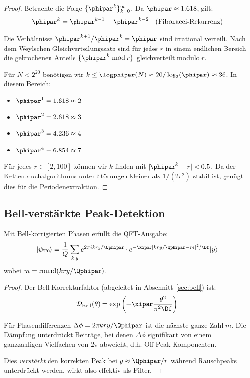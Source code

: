 \begin{proof}
	Betrachte die Folge $\{\phipar^k\}_{k=0}^{\infty}$. Da $\phipar \approx 1.618$, gilt:
	\begin{equation}
		\phipar^k = \phipar^{k-1} + \phipar^{k-2} \quad \text{(Fibonacci-Rekurrenz)}
	\end{equation}
	
	Die Verhältnisse $\phipar^{k+1}/\phipar^k = \phipar$ sind irrational verteilt. Nach dem Weylschen Gleichverteilungssatz sind für jedes $r$ in einem endlichen Bereich die gebrochenen Anteile $\{\phipar^k \bmod r\}$ gleichverteilt modulo $r$.
	
	Für $N < 2^{20}$ benötigen wir $k \leq \logphipar(N) \approx 20/\log_2(\phipar) \approx 36$. In diesem Bereich:
	\begin{itemize}
		\item $\phipar^1 = 1.618 \approx 2$
		\item $\phipar^2 = 2.618 \approx 3$
		\item $\phipar^3 = 4.236 \approx 4$
		\item $\phipar^4 = 6.854 \approx 7$
	\end{itemize}
	
	Für jedes $r \in [2, 100]$ können wir $k$ finden mit $|\phipar^k - r| < 0.5$. Da der Kettenbruchalgorithmus unter Störungen kleiner als $1/(2r^2)$ stabil ist, genügt dies für die Periodenextraktion.
\end{proof}

\subsection{Bell-verstärkte Peak-Detektion}

\begin{lemma}
	\label{lem:bell_damping}
	Mit Bell-korrigierten Phasen erfüllt die QFT-Ausgabe:
	\begin{equation}
		|\psi_{\text{T0}}\rangle = \frac{1}{Q} \sum_{k,y} e^{2\pi i kry/\Qphipar} \cdot e^{-\xipar|kry/\Qphipar - m|^2/\Df} |y\rangle
	\end{equation}
	wobei $m = \text{round}(kry/\Qphipar)$.
\end{lemma}

\begin{proof}
	Der Bell-Korrekturfaktor (abgeleitet in Abschnitt~\ref{sec:bell}) ist:
	\begin{equation}
		\mathcal{D}_{\text{Bell}}(\theta) = \exp\left(-\xipar \frac{\theta^2}{\pi^2 \Df}\right)
	\end{equation}
	
	Für Phasendifferenzen $\Delta\phi = 2\pi kry/\Qphipar$ ist die nächste ganze Zahl $m$. Die Dämpfung unterdrückt Beiträge, bei denen $\Delta\phi$ signifikant von einem ganzzahligen Vielfachen von $2\pi$ abweicht, d.h. Off-Peak-Komponenten.
	
	Dies \emph{verstärkt} den korrekten Peak bei $y \approx \Qphipar/r$ während Rauschpeaks unterdrückt werden, wirkt also effektiv als Filter.
\end{proof}

